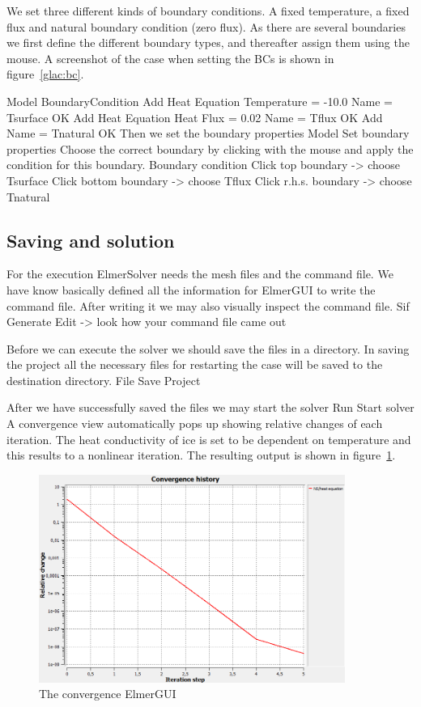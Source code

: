 We set three different kinds of boundary conditions. A fixed temperature, a fixed 
flux and natural boundary condition (zero flux). As there are several boundaries
we first define the different boundary types, and thereafter assign them using the mouse.
A screenshot of the case when setting the BCs is shown in figure~\ref{glac:bc}.

\ttbegin
Model
  BoundaryCondition
    Add 
      Heat Equation
        Temperature = -10.0
      Name = Tsurface
      OK
    Add 
      Heat Equation
        Heat Flux = 0.02
      Name = Tflux
      OK
    Add 
      Name = Tnatural
      OK
\ttend   
Then we set the boundary properties 
\ttbegin
Model 
  Set boundary properties  
\ttend
Choose the correct boundary by clicking with the mouse
and apply the condition for this boundary.
\ttbegin
Boundary condition
  Click top boundary -> choose Tsurface
  Click bottom boundary -> choose Tflux
  Click r.h.s. boundary -> choose Tnatural
\ttend

\subsection*{Saving and solution}

For the execution 
ElmerSolver needs the mesh files and the command file. We have know basically defined
all the information for ElmerGUI to write the command file. After writing it we may also visually 
inspect the command file.
\ttbegin
Sif 
  Generate
  Edit -> look how your command file came out  
\ttend

Before we can execute the solver we should save the files in a directory. In saving the project all the
necessary files for restarting the case will be saved to the 
destination directory.
\ttbegin
File 
  Save Project
\ttend

After we have successfully saved the files we may start the solver
\ttbegin
Run
  Start solver
\ttend
A convergence view automatically pops up showing relative changes of each iteration.
The heat conductivity of ice is set to be dependent on temperature and this results to a 
nonlinear iteration.
The resulting output is shown in figure~\ref{glac:conv}.

\begin{figure}
\begin{center}
\includegraphics[width=100mm]{glacier_toy_convergence}
\caption{The convergence  ElmerGUI}\label{glac:conv}
\end{center}
\end{figure}

